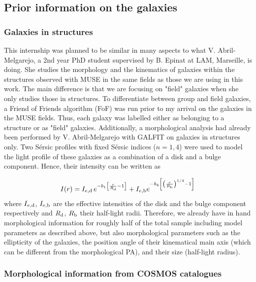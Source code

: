 \subsection{Prior information on the galaxies}

\subsubsection{Galaxies in structures}

This internship was planned to be similar in many aspects to what  V. Abril-Melgarejo, a 2nd year PhD student supervised by B. Epinat at LAM, Marseille, is doing. She studies the morphology and the kinematics of galaxies within the structures observed with MUSE in the same fields as those we are using in this work. The main difference is that we are focusing on "field" galaxies when she only studies those in structures. To differentiate between group and field galaxies, a Friend of Friends algorithm (FoF) was run prior to my arrival on the galaxies in the MUSE fields. Thus, each galaxy was labelled either as belonging to a structure or as "field" galaxies. Additionally, a morphological analysis had already been performed by V. Abril-Melgarejo with GALFIT on galaxies in structures only. Two Sérsic profiles with fixed Sérsic indices ($n = 1, 4$) were used to model the light profile of these galaxies as a combination of a disk and a bulge component. Hence, their intensity can be written as

\begin{equation}
	I(r) = I_{e, \rm{d}} \, e^{-b_1 \left [ \frac{r}{R_{\rm{d}}} -1 \right ]} + I_{e , \rm{b}} e^{- b_4 \left [ \left ( \frac{r}{R_{\rm{b}}} \right )^{1/4} -1 \right ]}
	\label{eq:GALFIT_light_profile}
\end{equation}
where $I_{e, \rm{d}}$, $I_{e, \rm{b}}$ are the effective intensities of the disk and the bulge component respectively and $R_{\rm{d}}$, $R_{\rm{b}}$ their half-light radii. Therefore, we already have in hand morphological information for roughly half of the total sample including model parameters as described above, but also morphological parameters such as the ellipticity of the galaxies, the position angle of their kinematical main axis (which can be different from the morphological PA), and their size (half-light radius).

\subsubsection{Morphological information from COSMOS catalogues}

